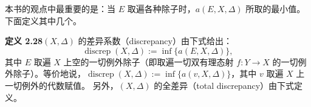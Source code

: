 
本书的观点中最重要的是：当 $E$ 取遍各种除子时，$a(E,X,\Delta)$ 所取的最小值。下面定义其中几个。

\par\medskip\noindent\textbf{定义 2.28}\quad $(X,\Delta)$ 的差异系数（discrepancy）由下式给出：
\[
\operatorname{discrep}(X,\Delta):=\inf\{a(E,X,\Delta)\},
\]
其中 $E$ 取遍 $X$ 上空的一切例外除子（即取遍一切双有理态射 $f\colon Y\to X$ 的一切例外除子）。等价地说，$\operatorname{discrep}(X,\Delta):=\inf\{a(v,X,\Delta)\}$，其中 $v$ 取遍 $X$ 上一切例外的代数赋值。
另外，$(X,\Delta)$ 的全差异（total discrepancy）由下式定义。
